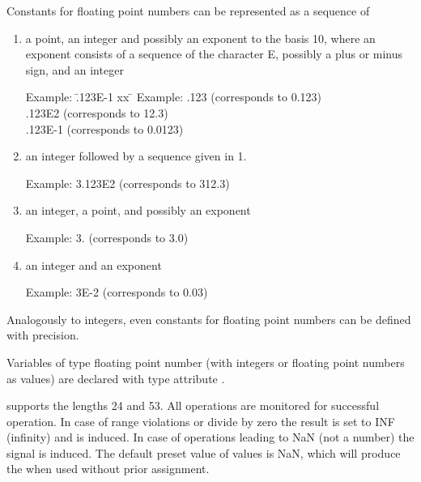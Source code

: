 Constants for floating point numbers can be represented as a sequence of
\begin{enumerate}
\item a point, an integer and possibly an exponent to the basis 10,
where an exponent consists of a sequence of the character E, possibly a
plus or minus sign, and an integer

\begin{tabbing}
Example: \= .123E-1 xx \=  \kill
Example: \> .123 \> (corresponds to 0.123)\\
 \> .123E2 \> (corresponds to 12.3)\\
 \> .123E-1 \> (corresponds to 0.0123)
\end{tabbing}

\item an integer followed by a sequence given in 1.

Example: 3.123E2 (corresponds to 312.3)

\item an integer, a point, and possibly an exponent

Example: 3. (corresponds to 3.0)

\item an integer and an exponent

Example: 3E-2 (corresponds to 0.03)
\end{enumerate}

Analogously to integers, even constants for floating point numbers can
be defined with precision.

Variables of type floating point number (with integers or floating point
numbers as values) are declared with type attribute .

\begin{grammarframe}

\end{grammarframe}


\OpenPEARL{} supports the lengths 24 and 53.
All operations are monitored for successful operation.
In case of range violations or
divide by zero the result is set to INF (infinity) and
 is induced.
In case of operations leading to NaN (not a number) the signal
 is induced.
The default preset value of  values is NaN, which will produce
the  when used without prior assignment.

